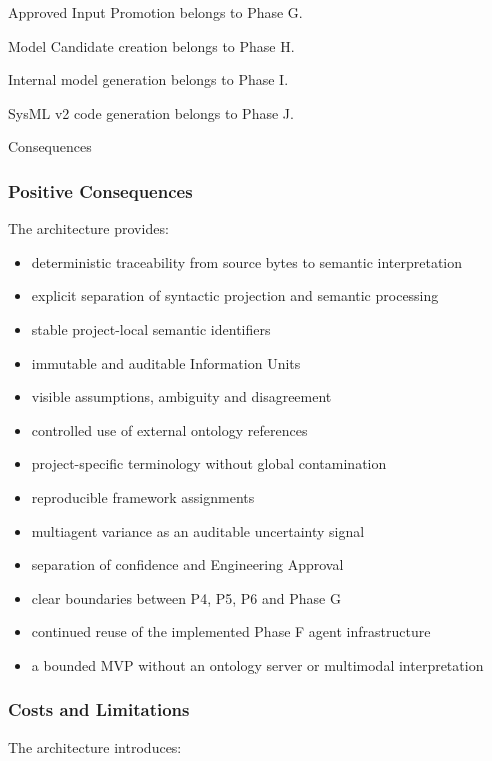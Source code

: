 Approved Input Promotion belongs to Phase G.

Model Candidate creation belongs to Phase H.

Internal model generation belongs to Phase I.

SysML v2 code generation belongs to Phase J.

Consequences

\hypertarget{positive-consequences}{%
\subsubsection{Positive Consequences}\label{positive-consequences}}

The architecture provides:

\begin{itemize}
\tightlist
\item
  deterministic traceability from source bytes to semantic interpretation
\item
  explicit separation of syntactic projection and semantic processing
\item
  stable project-local semantic identifiers
\item
  immutable and auditable Information Units
\item
  visible assumptions, ambiguity and disagreement
\item
  controlled use of external ontology references
\item
  project-specific terminology without global contamination
\item
  reproducible framework assignments
\item
  multiagent variance as an auditable uncertainty signal
\item
  separation of confidence and Engineering Approval
\item
  clear boundaries between P4, P5, P6 and Phase G
\item
  continued reuse of the implemented Phase F agent infrastructure
\item
  a bounded MVP without an ontology server or multimodal interpretation
\end{itemize}

\hypertarget{costs-and-limitations}{%
\subsubsection{Costs and Limitations}\label{costs-and-limitations}}

The architecture introduces:

